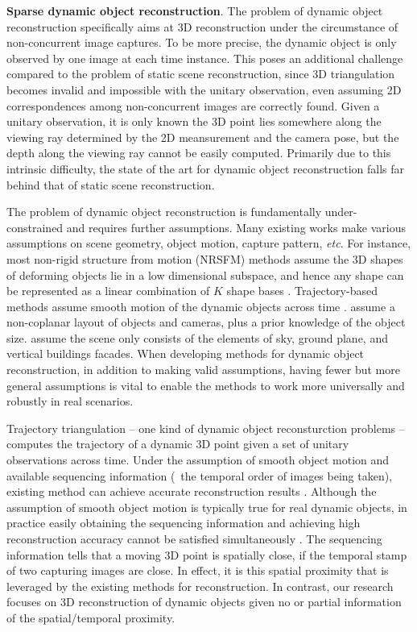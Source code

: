 \textbf{Sparse dynamic object reconstruction}.
The problem of dynamic object reconstruction specifically aims at 3D reconstruction under the circumstance of non-concurrent image captures. To be more precise, the dynamic object is only observed by one image at each time instance. This poses an additional challenge compared to the problem of static  scene reconstruction, since 3D triangulation becomes invalid and impossible with the unitary observation, even assuming 2D correspondences among non-concurrent images are correctly found. Given a unitary observation, it is only known the 3D point lies somewhere along the viewing ray determined by the 2D meansurement and the camera pose, but the depth along the viewing ray cannot be easily computed. Primarily due to this intrinsic difficulty, the state of the art for dynamic object reconstruction falls far behind that of static scene reconstruction.

The problem of dynamic object reconstruction is fundamentally under-constrained and requires further assumptions. Many existing works make various assumptions on scene geometry, object motion, capture pattern, \emph{etc}. For instance, most non-rigid structure from motion (NRSFM) methods assume the 3D shapes of deforming objects lie in a low dimensional subspace, and hence any shape can be represented as a linear combination of $K$ shape bases \cite{Bregler_CVPR2000,torresani2008nonrigid,dai2014simple}. Trajectory-based methods assume smooth motion of the dynamic objects across time \cite{Akhter_NIPS08}. \citet{bao2011toward} assume a non-coplanar layout of objects and cameras, plus a prior knowledge of the object size. \citet{Hoiem_CGRAPH2005} assume the scene only consists of the elements of sky, ground plane, and vertical buildings facades. When developing methods for dynamic object reconstruction, in addition to making valid assumptions, having fewer but more general assumptions is vital to enable the methods to work more universally and robustly in real scenarios. 

Trajectory triangulation -- one kind of dynamic object reconsturction problems -- computes the trajectory of a dynamic 3D point given a set of unitary observations across time. Under the assumption of smooth object motion and available sequencing information (\ie~the temporal order of images being taken), existing method can achieve accurate reconstruction results \cite{Park_ECCV2010,Valmadre_CVPR2012}. Although the assumption of smooth object motion is typically true for real dynamic objects, in practice easily obtaining the sequencing information and achieving high reconstruction accuracy cannot be satisfied simultaneously \cite{ZhuCL_CVPR11,Valmadre_CVPR2012}. The sequencing information tells that a moving 3D point is spatially close, if the temporal stamp of two capturing images are close. In effect, it is this spatial proximity that is leveraged by the existing methods \cite{Park_ECCV2010,Valmadre_CVPR2012} for reconstruction. In contrast, our research focuses on 3D reconstruction of dynamic objects given no or partial information of the spatial/temporal proximity.

